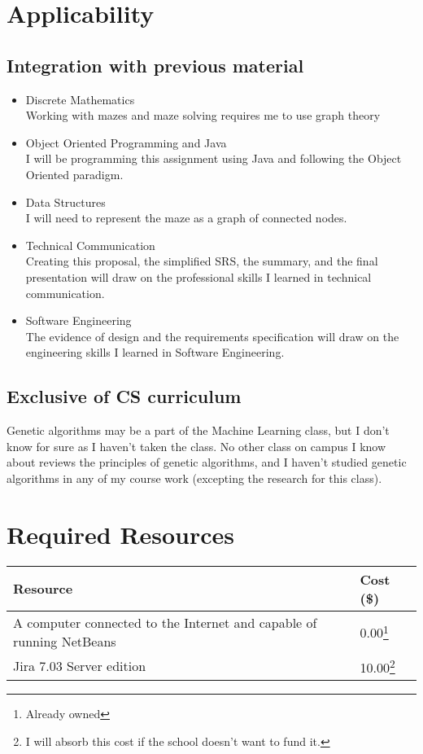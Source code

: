 \documentclass[letterpaper, 12pt]{article}
\begin{document}
\section{Applicability}
  \subsection{Integration with previous material}
  \begin{itemize}
	 \item Discrete Mathematics\\
		Working with mazes and maze solving requires me to use graph theory
	 \item Object Oriented Programming and Java\\
		I will be programming this assignment using Java and following the Object Oriented paradigm.
	 \item Data Structures\\
		I will need to represent the maze as a graph of connected nodes.
	 \item Technical Communication\\
		Creating this proposal, the simplified SRS, the summary, and the final presentation will draw on the professional skills I learned in technical communication.
	 \item Software Engineering\\
		The evidence of design and the requirements specification will draw on the engineering skills I learned in Software Engineering. 
  \end{itemize}
  \subsection{Exclusive of CS curriculum}
	 Genetic algorithms may be a part of the Machine Learning class, but I don't know for sure as I haven't taken the class.  No other class on campus I know about reviews the principles of genetic algorithms, and I haven't studied genetic algorithms in any of my course work (excepting the research for this class). 
\section{Required Resources}
\begin{center}	 
  \begin{tabular}{ll}
		\toprule
		\textbf{Resource} & \textbf{Cost (\$)}\\
		\midrule
		A computer connected to the Internet and capable of running NetBeans & 0.00\footnote{Already owned}\\
		Jira 7.03 Server edition & 10.00\footnote{I will absorb this cost if the school doesn't want to fund it.}\\
		\bottomrule
 \end{tabular}
\end{center}
\begin{sloppypar}
\printbibliography{}
\end{sloppypar}
\end{document}
